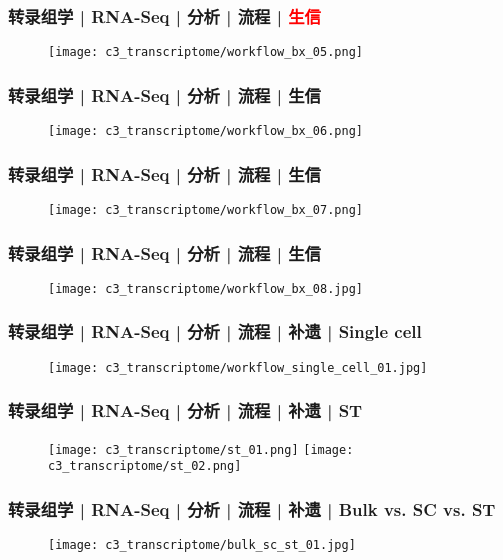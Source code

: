 \begin{frame}
  \frametitle{转录组学 | RNA-Seq | 分析 | 流程 | \textcolor{red}{生信}}
  \begin{figure}
    \centering
    \texttt{[image: c3\_transcriptome/workflow\_bx\_05.png]}
  \end{figure}
\end{frame}

\begin{frame}
  \frametitle{转录组学 | RNA-Seq | 分析 | 流程 | 生信}
  \begin{figure}
    \centering
    \texttt{[image: c3\_transcriptome/workflow\_bx\_06.png]}
  \end{figure}
\end{frame}

\begin{frame}
  \frametitle{转录组学 | RNA-Seq | 分析 | 流程 | 生信}
  \begin{figure}
    \centering
    \texttt{[image: c3\_transcriptome/workflow\_bx\_07.png]}
  \end{figure}
\end{frame}

\begin{frame}
  \frametitle{转录组学 | RNA-Seq | 分析 | 流程 | 生信}
  \begin{figure}
    \centering
    \texttt{[image: c3\_transcriptome/workflow\_bx\_08.jpg]}
  \end{figure}
\end{frame}

\begin{frame}
  \frametitle{转录组学 | RNA-Seq | 分析 | 流程 | 补遗 | Single cell}
  \begin{figure}
    \centering
    \texttt{[image: c3\_transcriptome/workflow\_single\_cell\_01.jpg]}
  \end{figure}
\end{frame}

\begin{frame}
  \frametitle{转录组学 | RNA-Seq | 分析 | 流程 | 补遗 | ST}
  \begin{figure}
    \centering
    \texttt{[image: c3\_transcriptome/st\_01.png]}
    \texttt{[image: c3\_transcriptome/st\_02.png]}
  \end{figure}
\end{frame}

\begin{frame}
  \frametitle{转录组学 | RNA-Seq | 分析 | 流程 | 补遗 | Bulk vs. SC vs. ST}
  \begin{figure}
    \centering
    \texttt{[image: c3\_transcriptome/bulk\_sc\_st\_01.jpg]}
  \end{figure}
\end{frame}

